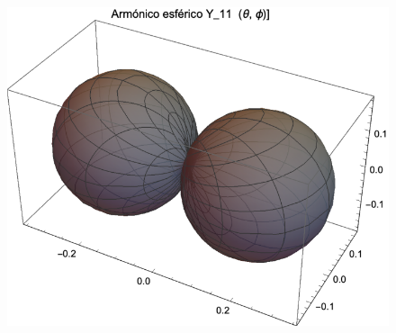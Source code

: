 \documentclass[12pt]{beamer}
\begin{document}
\begin{frame}[plain]
\begin{figure}
    \centering
    \includegraphics[scale=0.65]{Imagenes/Armonicos_Esfericos_11.eps}
\end{figure}
\end{frame}
\end{document}
